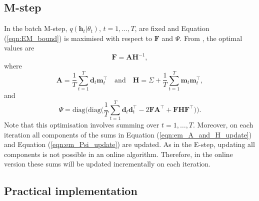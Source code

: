 \documentclass[msc,deptreport.inf]{infthesis} %
\newcommand{\matr}[1]{\mathbf{#1}}
\begin{document}
\subsection{M-step}

In the batch M-step, $q(\matr{h}_t | \theta_t)$, $t=1,\dots,T$, are fixed and Equation (\ref{eqn:EM_bound}) is maximised with respect to $\matr{F}$ and $\Psi$. From \cite{barber2007}, the optimal values are 
\begin{equation}
	\matr{F} = \matr{A}\matr{H}^{-1},
\end{equation}
where
\begin{equation}\label{eqn:em_A_and_H_update}
	\matr{A} = \frac{1}{T} \sum_{t=1}^T \matr{d}_t \matr{m}_t^\intercal \quad \text{and} \quad 
	\matr{H} = \Sigma + \frac{1}{T} \sum_{t=1}^T \matr{m}_t \matr{m}_t^\intercal,
\end{equation}
and
\begin{equation}\label{eqn:em_Psi_update}
	\Psi = \text{diag}\Bigg(\text{diag}\Bigg( \frac{1}{T} \sum_{t=1}^T \matr{d}_t \matr{d}_t^\intercal - 2\matr{FA}^\intercal + \matr{FHF}^\intercal \Bigg)\Bigg).
\end{equation}
Note that this optimisation involves summing over $t=1,\dots,T$. Moreover, on each iteration all components of the sums in Equation (\ref{eqn:em_A_and_H_update}) and Equation (\ref{eqn:em_Psi_update}) are updated. As in the E-step, updating all components is not possible in an online algorithm. Therefore, in the online version these sums will be updated incrementally on each iteration. 

\subsection{Practical implementation}
\end{document}
